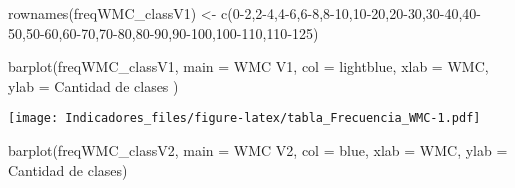 \documentclass[
]{article}
\newenvironment{Shaded}{\begin{snugshade}}{\end{snugshade}}
\newcommand{\AttributeTok}[1]{\textcolor[rgb]{0.77,0.63,0.00}{#1}}
\newcommand{\FunctionTok}[1]{\textcolor[rgb]{0.00,0.00,0.00}{#1}}
\newcommand{\NormalTok}[1]{#1}
\newcommand{\OtherTok}[1]{\textcolor[rgb]{0.56,0.35,0.01}{#1}}
\newcommand{\StringTok}[1]{\textcolor[rgb]{0.31,0.60,0.02}{#1}}
\begin{document}
\begin{Shaded}
\begin{Highlighting}[]
\FunctionTok{rownames}\NormalTok{(freqWMC\_classV1) }\OtherTok{\textless{}{-}} \FunctionTok{c}\NormalTok{(}\StringTok{\textquotesingle{}0{-}2\textquotesingle{}}\NormalTok{,}\StringTok{\textquotesingle{}2{-}4\textquotesingle{}}\NormalTok{,}\StringTok{\textquotesingle{}4{-}6\textquotesingle{}}\NormalTok{,}\StringTok{\textquotesingle{}6{-}8\textquotesingle{}}\NormalTok{,}\StringTok{\textquotesingle{}8{-}10\textquotesingle{}}\NormalTok{,}\StringTok{\textquotesingle{}10{-}20\textquotesingle{}}\NormalTok{,}\StringTok{\textquotesingle{}20{-}30\textquotesingle{}}\NormalTok{,}\StringTok{\textquotesingle{}30{-}40\textquotesingle{}}\NormalTok{,}\StringTok{\textquotesingle{}40{-}50\textquotesingle{}}\NormalTok{,}\StringTok{\textquotesingle{}50{-}60\textquotesingle{}}\NormalTok{,}\StringTok{\textquotesingle{}60{-}70\textquotesingle{}}\NormalTok{,}\StringTok{\textquotesingle{}70{-}80\textquotesingle{}}\NormalTok{,}\StringTok{\textquotesingle{}80{-}90\textquotesingle{}}\NormalTok{,}\StringTok{\textquotesingle{}90{-}100\textquotesingle{}}\NormalTok{,}\StringTok{\textquotesingle{}100{-}110\textquotesingle{}}\NormalTok{,}\StringTok{\textquotesingle{}110{-}125\textquotesingle{}}\NormalTok{)}

\FunctionTok{barplot}\NormalTok{(freqWMC\_classV1,}
        \AttributeTok{main =} \StringTok{\textquotesingle{}WMC V1\textquotesingle{}}\NormalTok{,}
        \AttributeTok{col =} \StringTok{\textquotesingle{}lightblue\textquotesingle{}}\NormalTok{,}
        \AttributeTok{xlab =} \StringTok{\textquotesingle{}WMC\textquotesingle{}}\NormalTok{,}
        \AttributeTok{ylab =} \StringTok{\textquotesingle{}Cantidad de clases \textquotesingle{}}\NormalTok{)}
\end{Highlighting}
\end{Shaded}

\texttt{[image: Indicadores\_files/figure-latex/tabla\_Frecuencia\_WMC-1.pdf]}

\begin{Shaded}
\begin{Highlighting}[]
\FunctionTok{barplot}\NormalTok{(freqWMC\_classV2,}
        \AttributeTok{main =} \StringTok{\textquotesingle{}WMC V2\textquotesingle{}}\NormalTok{,}
        \AttributeTok{col =} \StringTok{\textquotesingle{}blue\textquotesingle{}}\NormalTok{,}
        \AttributeTok{xlab =} \StringTok{\textquotesingle{}WMC\textquotesingle{}}\NormalTok{,}
        \AttributeTok{ylab =} \StringTok{\textquotesingle{}Cantidad de clases\textquotesingle{}}\NormalTok{)}
\end{Highlighting}
\end{Shaded}
\end{document}
